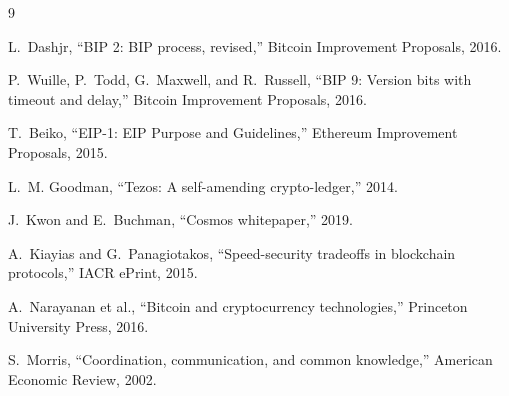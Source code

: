 \documentclass[11pt,a4paper]{article}
\theoremstyle{definition}
\theoremstyle{remark}
\begin{document}

\begin{thebibliography}{9}

L.~Dashjr, ``BIP 2: BIP process, revised,'' Bitcoin Improvement Proposals, 2016.

P.~Wuille, P.~Todd, G.~Maxwell, and R.~Russell, ``BIP 9: Version bits with timeout and delay,'' Bitcoin Improvement Proposals, 2016.

T.~Beiko, ``EIP-1: EIP Purpose and Guidelines,'' Ethereum Improvement Proposals, 2015.

L.~M. Goodman, ``Tezos: A self-amending crypto-ledger,'' 2014.

J.~Kwon and E.~Buchman, ``Cosmos whitepaper,'' 2019.

A.~Kiayias and G.~Panagiotakos, ``Speed-security tradeoffs in blockchain protocols,'' IACR ePrint, 2015.

A.~Narayanan et al., ``Bitcoin and cryptocurrency technologies,'' Princeton University Press, 2016.

S.~Morris, ``Coordination, communication, and common knowledge,'' American Economic Review, 2002.

\end{thebibliography}
\end{document}
